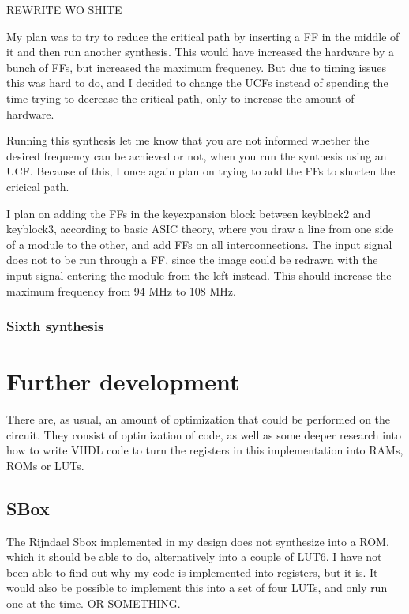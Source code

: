 REWRITE WO SHITE




My plan was to try to reduce the critical path by inserting a FF in the 
middle of it and then run another synthesis. This would have increased 
the hardware by a bunch of FFs, but increased the maximum frequency. 
But due to timing issues this was hard to do, and I decided to change 
the UCFs instead of spending the time trying to decrease the critical 
path, only to increase the amount of hardware.

Running this synthesis let me know that you are not informed whether the
desired frequency can be achieved or not, when you run the synthesis 
using an UCF. Because of this, I once again plan on trying to add the 
FFs to shorten the cricical path. 

I plan on adding the FFs in the keyexpansion block between keyblock2 and 
keyblock3, according to basic ASIC theory, where you draw a line from one 
side of a module to the other, and add FFs on all interconnections. The 
input signal does not to be run through a FF, since the image could be 
redrawn with the input signal entering the module from the left instead. 
This should increase the maximum frequency from 94 MHz to 108 MHz.

\subsubsection{Sixth synthesis}


\section{Further development}
There are, as usual, an amount of optimization that could be performed 
on the circuit. They consist of optimization of code, as well as some 
deeper research into how to write VHDL code to turn the registers in 
this implementation into RAMs, ROMs or LUTs.

\subsection{SBox}
The Rijndael Sbox implemented in my design does not synthesize into a 
ROM, which it should be able to do, alternatively into a couple of LUT6.
I have not been able to find out why my code is implemented into 
registers, but it is. 
It would also be possible to implement this into a set of four LUTs, 
and only run one at the time. OR SOMETHING.

